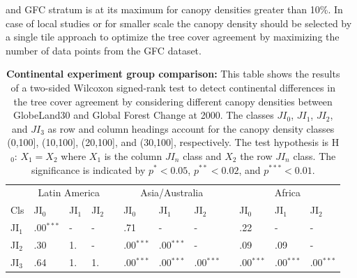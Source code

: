 and \ac{GFC} stratum is at its maximum for canopy densities greater than 10\%. In case of local studies or for smaller scale the canopy density should be selected by a single tile approach to optimize the tree cover agreement by maximizing the number of data points from the \ac{GFC} dataset.
			\begin{table}[ht]
				\centering
				\caption[Continental experiment group comparison]{\textbf{Continental experiment group comparison:} This table shows the results of a two-sided Wilcoxon signed-rank test to detect continental differences in the tree cover agreement by considering different canopy densities between GlobeLand30 and Global Forest Change at 2000. The classes $JI_0$, $JI_1$, $JI_2$, and $JI_3$ as row and column headings account for the canopy density classes (0,100], (10,100], (20,100], and (30,100], respectively. The test hypothesis is H$_0$: $X_1=X_2$ where $X_1$ is the column $JI_n$ class and $X_2$ the row $JI_n$ class. The significance is indicated by $p^{*}<0.05$, $p^{**}<0.02$, and $p^{***}<0.01$.}
				\label{tab:wilcoxontwosided_regions}
				\begin{tabular}{llllllllllll}
					\hline
					& \multicolumn{3}{c}{Latin America} && \multicolumn{3}{c}{Asia/Australia} && \multicolumn{3}{c}{Africa} \\\cline{2-4}\cline{6-8}\cline{10-12}
					Cls & JI$_0$ & JI$_1$ & JI$_2$ && JI$_0$ & JI$_1$ & JI$_2$ && JI$_0$ & JI$_1$ & JI$_2$ \\\hline
					JI$_1$ & .00$^{***}$ & - & - && .71 & - & - && .22 & - & - \\
					JI$_2$ & .30 & 1. & - && .00$^{***}$ & .00$^{***}$ & - && .09 & .09  & - \\
					JI$_3$ & .64 & 1. & 1. && .00$^{***}$ & .00$^{***}$ & .00$^{***}$ && .00$^{***}$ & .00$^{***}$ & .00$^{***}$ \\\hline
				\end{tabular}
			\end{table}
